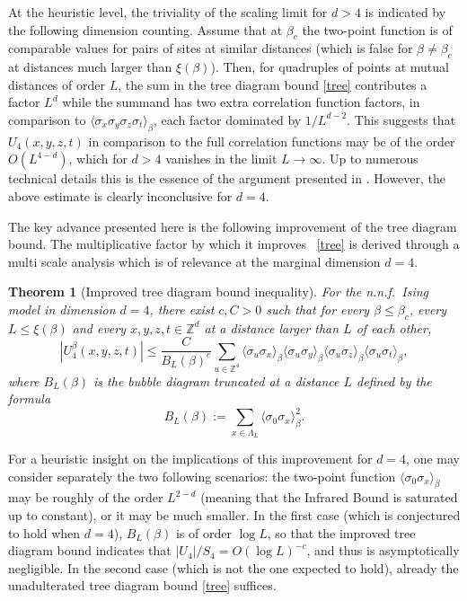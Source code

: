 \documentclass[a4paper,oneside,11pt]{article}
\def\blue#1{\textcolor{blue}{ #1}} %
\def\Z{\mathbb{Z}}                          %
\newtheorem{theorem}{Theorem}[section]
\newcommand{\be}[1]{\begin{equation}\label{#1}}
\newcommand{\ee}{\end{equation}}
\numberwithin{equation}{section}
\numberwithin{equation}{section}
\numberwithin{equation}{section}
\def\Z{\mathbb{Z}}                          %
\def\be{\begin{equation}}
\def\ee{\end{equation}}
\renewcommand{\blue}{\textcolor{blue}}
\begin{document}
At the heuristic level,  the triviality of the scaling limit for $d>4$ is indicated by the following dimension counting.  Assume that at $\beta_c$ the two-point function is of comparable values for pairs of sites at similar distances (which is false for $\beta \neq \beta_c$ at distances much larger than $\xi(\beta)$).  Then, for  quadruples of points at mutual distances of order $L$, the sum in the tree diagram bound \eqref{tree}  contributes a factor $L^d$ while the summand has two extra correlation function factors, in comparison to 
$\langle\sigma_x\sigma_y\sigma_z\sigma_t\rangle_\beta
$, each factor dominated by $1/L^{d-2}$.  
This suggests that $U_4(x,y,z,t)$ in comparison to the full correlation functions may be of the order $O(L^{4-d})$, which for $d>4$   vanishes in the limit $L\to \infty$.   Up to numerous technical details this is the essence of the argument presented  in \cite{Aiz82,Fro82}.  
However, the above estimate is clearly  inconclusive for $d=4$. 



The key advance presented here is the following improvement of the tree diagram bound.  The multiplicative  factor by which it improves ~\eqref{tree} is derived through a multi scale analysis which is of relevance at the marginal dimension $d=4$.  

\begin{theorem}[Improved tree diagram bound inequality]\label{thm:improved tree bound simple} For the n.n.f.~Ising model in dimension $ d=4$, there exist $c,C>0$ such that for every $\beta\le \beta_c$, every $L\le \xi(\beta)$ and every $x,y,z,t\in\Z^d$ at a distance larger than $L$ of each other,
\be\label{eq:improved tree bound}
|U_4^\beta(x,y,z,t)|\le \frac C{B_L(\beta)^c}\sum_{u\in\Z^4} \langle \sigma_u\sigma_x\rangle_\beta  
 \langle \sigma_u\sigma_y\rangle_\beta  
  \langle \sigma_u\sigma_z\rangle_\beta     
   \langle \sigma_u\sigma_t\rangle_\beta,
\ee
where $B_L(\beta)$ is the {\em bubble diagram} truncated at a distance $L$ defined by the formula
\be \label{B_L}
B_L(\beta):=\sum_{x\in\Lambda_L}\langle\sigma_0\sigma_x\rangle_\beta^2.
\ee
\end{theorem}


For a heuristic insight on the implications of this improvement for $d=4$, one may consider separately the two following scenarios:   the two-point function $\langle\sigma_0\sigma_x\rangle_\beta$ may be  roughly of the order  $L^{2-d}$ (meaning that the Infrared Bound is saturated up to constant), or it may be much smaller.  In the first case (which is conjectured to hold when $d=4$),  $B_L(\beta)$ is of order $\log L$, so that the improved tree diagram bound indicates that  $|U_4|/S_4 = O(\log L)^{-c}$, and thus is asymptotically negligible.  In the second case (which is not the one expected to hold), already the unadulterated  tree diagram bound \eqref{tree} suffices.
\end{document}
